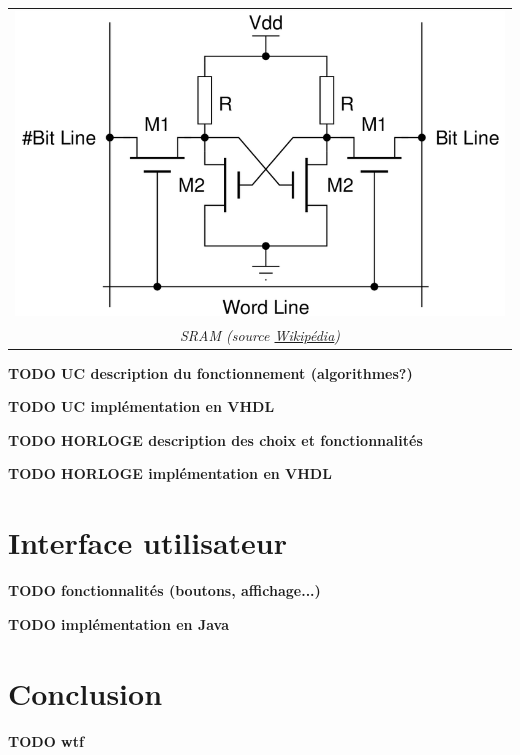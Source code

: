 \documentclass[a4paper]{article} %
\begin{document}
\begin{center}
\begin{tabular}{c}
\includegraphics[scale=0.3]{4T_SRAM_Cell.png} \\
\textit{SRAM (source \href{http://en.wikipedia.org/wiki/Static_random-access_memory}{Wikipédia})}
\end{tabular}
\end{center}

\textbf{TODO UC description du fonctionnement (algorithmes?)}

\textbf{TODO UC implémentation en VHDL}

\textbf{TODO HORLOGE description des choix et fonctionnalités}

\textbf{TODO HORLOGE implémentation en VHDL}


\section{Interface utilisateur}

\textbf{TODO fonctionnalités (boutons, affichage...)}

\textbf{TODO implémentation en Java}


\section{Conclusion}

\textbf{TODO wtf}
\end{document}
